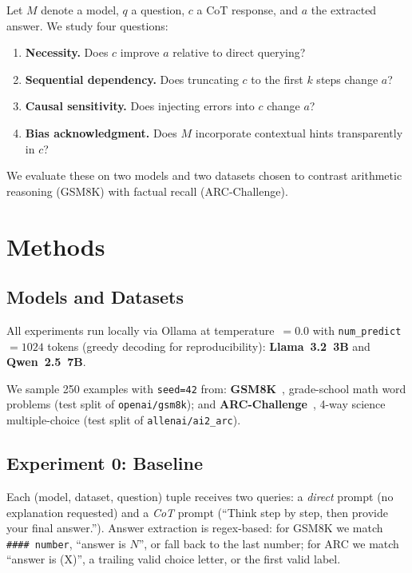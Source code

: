 \documentclass[11pt,twocolumn]{article}
\begin{document}
Let $M$ denote a model, $q$ a question, $c$ a CoT response, and $a$ the
extracted answer. We study four questions:
\begin{enumerate}
  \setlength\itemsep{0pt}
  \item \textbf{Necessity.} Does $c$ improve $a$ relative to direct querying?
  \item \textbf{Sequential dependency.} Does truncating $c$ to the first $k$
        steps change $a$?
  \item \textbf{Causal sensitivity.} Does injecting errors into $c$ change $a$?
  \item \textbf{Bias acknowledgment.} Does $M$ incorporate contextual hints
        transparently in $c$?
\end{enumerate}
We evaluate these on two models and two datasets chosen to contrast arithmetic
reasoning (GSM8K) with factual recall (ARC-Challenge).


\section{Methods}

\subsection{Models and Datasets}

All experiments run locally via Ollama at temperature~$= 0.0$ with
\texttt{num\_predict}~$= 1024$ tokens (greedy decoding for reproducibility):
\textbf{Llama~3.2~3B} and \textbf{Qwen~2.5~7B}.

We sample 250 examples with \texttt{seed=42} from:
\textbf{GSM8K}~\citep{cobbe2021training}, grade-school math word problems
(test split of \texttt{openai/gsm8k}); and
\textbf{ARC-Challenge}~\citep{clark2018think}, 4-way science multiple-choice
(test split of \texttt{allenai/ai2\_arc}).

\subsection{Experiment 0: Baseline}

Each (model, dataset, question) tuple receives two queries: a
\emph{direct} prompt (no explanation requested) and a \emph{CoT} prompt
(``Think step by step, then provide your final answer.'').
Answer extraction is regex-based: for GSM8K we match \texttt{\#\#\#\# number},
``answer is $N$'', or fall back to the last number; for ARC we match ``answer
is (X)'', a trailing valid choice letter, or the first valid label.
\end{document}
